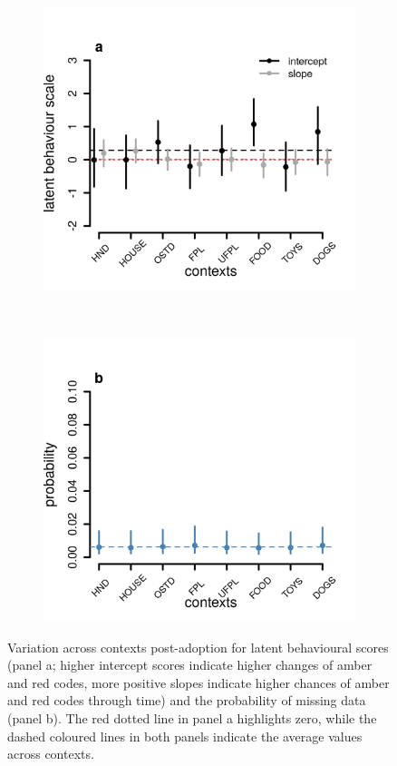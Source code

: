 \documentclass[12pt]{article}
\begin{document}
\begin{figure}[]
  \centering
  \begin{subfigure}{0.5\textwidth}
    \includegraphics[scale=0.6]{figures/figure_S2_a}
  \end{subfigure}%
  ~
  \begin{subfigure}{0.5\textwidth}
    \includegraphics[scale=0.6]{figures/figure_S2_b}
  \end{subfigure}%
\caption{Variation across contexts post-adoption for latent behavioural scores (panel a; higher intercept scores indicate higher changes of amber and red codes, more positive slopes indicate higher chances of amber and red codes through time) and the probability of missing data (panel b). The red dotted line in panel a highlights zero, while the dashed coloured lines in both panels indicate the average values across contexts.
}
\label{fig_2}
\end{figure}
\end{document}
